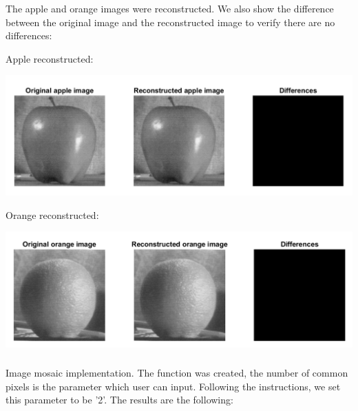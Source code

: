 \documentclass[a4paper]{iacas}
\begin{document}
\subsubsection{}
The apple and orange images were reconstructed. We also show the difference between the original image and the reconstructed image to verify there are no differences:

Apple reconstructed:
\vskip 0.1in
\begin{minipage}{1\textwidth}
\centering
	\includegraphics[scale=0.9]{../imgs/imgs_q5/q5_apple_reconstructed.png}
\end{minipage}
\vskip 0.1in


Orange reconstructed:
\vskip 0.1in
\begin{minipage}{1\textwidth}
\centering
	\includegraphics[scale=0.9]{../imgs/imgs_q5/q5_orange_reconstructed.png}
\end{minipage}
\vskip 0.1in


\subsubsection{}
Image mosaic implementation. The function was created, the number of common pixels is the parameter which user can input. Following the instructions, we set this parameter to be '2'. The results are the following:
\end{document}

